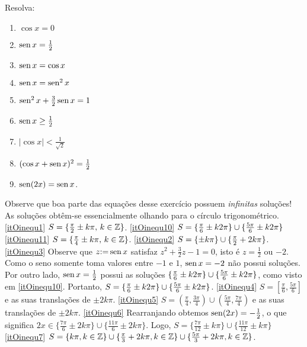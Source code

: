 \begin{exo}\label{exoequacoestrigo}
 Resolva:
\begin{multicols}{3}
\begin{enumerate}
 \item\label{itOinequ1} $\cos x=0$
 \item\label{itOinequ10} $\operatorname{sen} x=\frac{1}{2}$
\item \label{itOinequ11} $\operatorname{sen} x=\cos x$
\item \label{itOinequ2} $\operatorname{sen} x=\operatorname{sen}^2 x$
\item \label{itOinequ3} $\operatorname{sen}^2x+\tfrac{3}{2}\operatorname{sen} x=1$
\item \label{itOinequ4} $\operatorname{sen} x\geq \tfrac12$
\item \label{itOinequ5} $|\cos x|< \tfrac{1}{\sqrt{2}}$
\item \label{itOinequ6} $(\cos x+\operatorname{sen} x)^2=\tfrac12$
\item \label{itOinequ7} $\operatorname{sen} (2x)=\operatorname{sen} x$.
\end{enumerate}
\end{multicols}
\vspace{0.01cm}
\begin{sol}
Observe que boa parte das equações desse exercício possuem \emph{infinitas} soluções!
As soluções obtêm-se essencialmente olhando para o círculo trigonométrico.
\eqref{itOinequ1} $S=\{\tfrac{\pi}{2}\pm k\pi,\,k\in \mathbb{Z}\}$.
\eqref{itOinequ10} $S=\{\tfrac{\pi}{6}\pm k2\pi\}\cup \{\tfrac{5\pi}{6}\pm k2\pi\}$
\eqref{itOinequ11} $S=\{\tfrac{\pi}{4}\pm k\pi,\,k\in \mathbb{Z}\}$.
\eqref{itOinequ2} $S=\{\pm k\pi\}\cup \{\tfrac{\pi}{2}+2k\pi\}$.
\eqref{itOinequ3}  Observe que $z{:=} \operatorname{sen} x$ satisfaz $z^2+\tfrac{3}{2}z-1=0$, isto é
$z=\tfrac{1}{2}$ ou $-2$. Como o seno somente toma valores entre $-1$ e $1$, $\operatorname{sen} x=-2$
não possui soluções. Por outro lado, $\operatorname{sen} x=\frac{1}{2}$ possui as soluções $\{\tfrac{\pi}{6}\pm
k2\pi\}\cup \{\tfrac{5\pi}{6}\pm k2\pi\}$, como visto em \eqref{itOinequ10}.
Portanto, $S=\{\tfrac{\pi}{6}\pm k2\pi\}\cup \{\tfrac{5\pi}{6}\pm k2\pi\}$.
\eqref{itOinequ4}  $S=[\tfrac{\pi}{6},\tfrac{5\pi}{6}]$ e as suas translações de $\pm
2k\pi$.
\eqref{itOinequ5} 
$S=(\tfrac{\pi}{4},\tfrac{3\pi}{4})\cup(\tfrac{5\pi}{4},\tfrac{7\pi}{4})$ e as suas
translações de $\pm 2k\pi$.
 \eqref{itOinequ6} Rearranjando obtemos $\operatorname{sen} (2x)=-\tfrac12$, o que significa $2x\in
\{\frac{7\pi}{6}\pm 2k\pi\}\cup \{\frac{11\pi}{6}\pm 2k\pi\}$. Logo,
$S= \{\frac{7\pi}{12}\pm k\pi\}\cup \{\frac{11\pi}{12}\pm k\pi\}$
 \eqref{itOinequ7} $S=\{k\pi,k\in\mathbb{Z}\}\cup \{\tfrac{\pi}{3}+2k\pi,k\in\mathbb{Z}\}\cup
\{\tfrac{5\pi}{3}+2k\pi,k\in\mathbb{Z}\}$.
\end{sol}
\end{exo}


